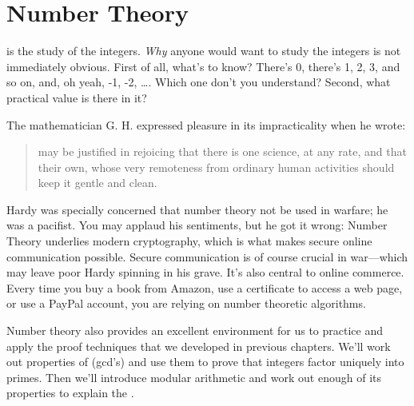 \chapter{Number Theory}\label{number_theory_chap}
 is the study of the integers.  \emph{Why} anyone
would want to study the integers is not immediately obvious.  First of
all, what's to know?  There's 0, there's 1, 2, 3, and so on, and, oh yeah,
-1, -2, \dots.   Which one don't you understand?  Second, what practical
value is there in it?

\iffalse
Number theory is right at the core of mathematics; even Ug the Caveman
surely had some grasp of the integers---at least the positive ones.
In fact, the integers are so elementary that one might ask, ``What's
to study?''  There's 0, there's 1, 2, 3 and so on, and there's the
negatives.  Which one don't you understand?  Doesn't math become easy
when we don't have to worry about nasty numbers like $\sqrt{7}$, $1 /
\pi$, and $i$?  We can even forget about fractions!
\fi

The mathematician G. H.  expressed pleasure in its
impracticality when he wrote:
%
 \begin{quotation}
  may be justified in rejoicing that there
 is one science, at any rate, and that their own, whose very remoteness
 from ordinary human activities should keep it gentle and clean.
 \end{quotation}
%

 Hardy was specially concerned that number theory not be used in
 warfare; he was a pacifist.  You may applaud his sentiments, but he
 got it wrong: Number Theory underlies modern cryptography, which is
 what makes secure online communication possible.  Secure
 communication is of course crucial in war---which may leave poor
 Hardy spinning in his grave.  It's also central to online commerce.
 Every time you buy a book from Amazon, use a certificate to access a
 web page, or use a PayPal account, you are relying on number
 theoretic algorithms.

Number theory also provides an excellent environment for us to
practice and apply the proof techniques that we developed in previous
chapters.  We'll work out properties of 
(gcd's) and use them to prove that integers factor uniquely into
primes.  Then we'll introduce modular arithmetic and work out enough
of its properties to explain the .


